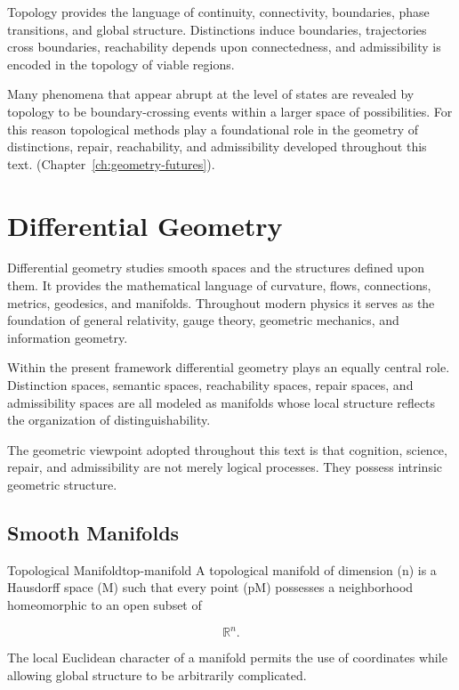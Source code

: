 \documentclass[12pt,twoside,openright]{book}
\begin{document}
Topology provides the language of continuity,
connectivity, boundaries, phase transitions, and global
structure. Distinctions induce boundaries, trajectories
cross boundaries, reachability depends upon connectedness,
and admissibility is encoded in the topology of viable
regions.

Many phenomena that appear abrupt at the level of states
are revealed by topology to be boundary-crossing events
within a larger space of possibilities. For this reason
topological methods play a foundational role in the
geometry of distinctions, repair, reachability, and
admissibility developed throughout this text.
(Chapter~\ref{ch:geometry-futures}).

\section{Differential Geometry}

Differential geometry studies smooth spaces and the
structures defined upon them. It provides the mathematical
language of curvature, flows, connections, metrics,
geodesics, and manifolds. Throughout modern physics it
serves as the foundation of general relativity, gauge
theory, geometric mechanics, and information geometry.

Within the present framework differential geometry plays
an equally central role. Distinction spaces, semantic
spaces, reachability spaces, repair spaces, and
admissibility spaces are all modeled as manifolds whose
local structure reflects the organization of distinguishability.

The geometric viewpoint adopted throughout this text is
that cognition, science, repair, and admissibility are
not merely logical processes. They possess intrinsic
geometric structure.

\subsection{Smooth Manifolds}

\begin{definition}{Topological Manifold}{top-manifold}
A topological manifold of dimension (n) is a Hausdorff
space (M) such that every point (p\in M) possesses a
neighborhood homeomorphic to an open subset of

\[
\mathbb R^n.
\]
\end{definition}

The local Euclidean character of a manifold permits the
use of coordinates while allowing global structure to be
arbitrarily complicated.
\end{document}
